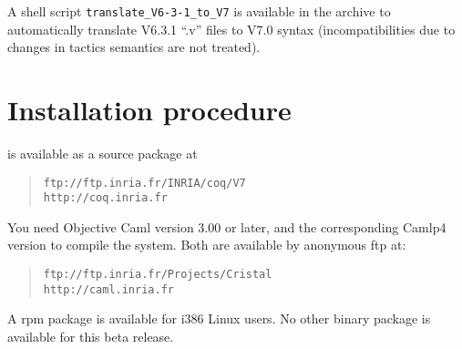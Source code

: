\documentclass[11pt]{article}
\begin{document}
A shell script \verb=translate_V6-3-1_to_V7= is available in the archive to
automatically translate V6.3.1 ``.v'' files to V7.0 syntax
(incompatibilities due to changes in tactics semantics are not
treated).


\section{Installation procedure}


{\Coq} is available as a source package at 

\begin{quote}
\verb|ftp://ftp.inria.fr/INRIA/coq/V7|\\
\verb|http://coq.inria.fr|
\end{quote}

You need Objective Caml version 3.00 or later, and the corresponding 
Camlp4 version to compile the system. Both are available by anonymous ftp
at:

\begin{quote}
\verb|ftp://ftp.inria.fr/Projects/Cristal|\\
\verb|http://caml.inria.fr|
\end{quote}

\noindent
%

A rpm package is available for i386 Linux users. No other binary
package is available for this beta release.

%
\end{document}

